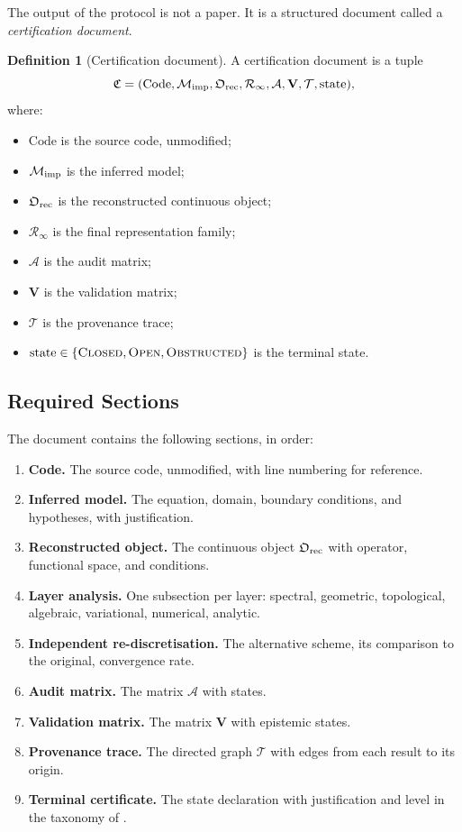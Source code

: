 \documentclass[11pt,a4paper]{article}
\theoremstyle{definition}
\newtheorem{definition}{Definition}[section]
\theoremstyle{plain}
\newcommand{\Ob}{\mathfrak{O}}
\newcommand{\Rcal}{\mathcal{R}}
\newcommand{\Mcal}{\mathcal{M}}
\newcommand{\Acal}{\mathcal{A}}
\newcommand{\Tcal}{\mathcal{T}}
\newcommand{\Vmat}{\mathbf{V}}
\newcommand{\STCLOSED}{\textsc{Closed}}
\newcommand{\STOPEN}{\textsc{Open}}
\newcommand{\STOBSTR}{\textsc{Obstructed}}
\begin{document}
The output of the protocol is not a paper. It is a structured
document called a \emph{certification document}.

\begin{definition}[Certification document]\label{def:cert}
A certification document is a tuple
\[
  \mathfrak{C} = (\mathrm{Code}, \Mcal_{\rm imp}, \Ob_{\rm rec},
    \Rcal_\infty, \Acal, \Vmat, \Tcal, \mathrm{state}),
\]
where:
\begin{itemize}
  \item $\mathrm{Code}$ is the source code, unmodified;
  \item $\Mcal_{\rm imp}$ is the inferred model;
  \item $\Ob_{\rm rec}$ is the reconstructed continuous object;
  \item $\Rcal_\infty$ is the final representation family;
  \item $\Acal$ is the audit matrix;
  \item $\Vmat$ is the validation matrix;
  \item $\Tcal$ is the provenance trace;
  \item $\mathrm{state} \in \{\STCLOSED, \STOPEN, \STOBSTR\}$ is
        the terminal state.
\end{itemize}
\end{definition}

\subsection{Required Sections}

The document contains the following sections, in order:

\begin{enumerate}[label=\textbf{\S\arabic*.}]
  \item \textbf{Code.} The source code, unmodified, with line
        numbering for reference.
  \item \textbf{Inferred model.} The equation, domain, boundary
        conditions, and hypotheses, with justification.
  \item \textbf{Reconstructed object.} The continuous object
        $\Ob_{\rm rec}$ with operator, functional space, and
        conditions.
  \item \textbf{Layer analysis.} One subsection per layer: spectral,
        geometric, topological, algebraic, variational, numerical,
        analytic.
  \item \textbf{Independent re-discretisation.} The alternative
        scheme, its comparison to the original, convergence rate.
  \item \textbf{Audit matrix.} The matrix $\Acal$ with states.
  \item \textbf{Validation matrix.} The matrix $\Vmat$ with
        epistemic states.
  \item \textbf{Provenance trace.} The directed graph
        $\Tcal$ with edges from each result to its origin.
  \item \textbf{Terminal certificate.} The state declaration
        with justification and level in the taxonomy of
        \cite{paperIII}.
\end{enumerate}
\end{document}
